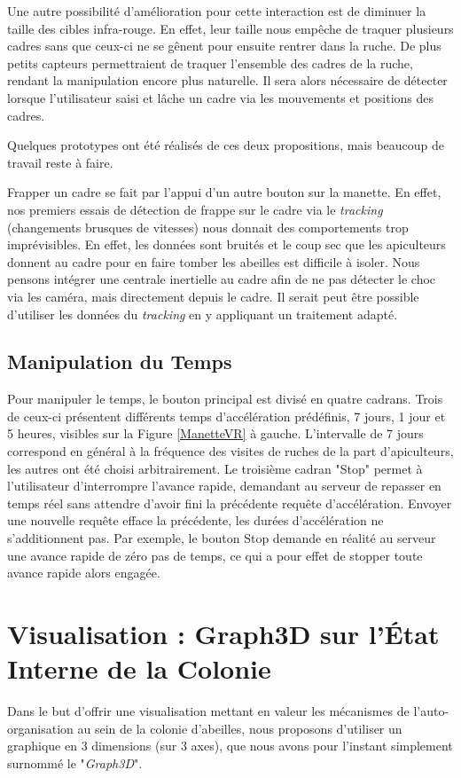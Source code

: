 		Une autre possibilité d'amélioration pour cette interaction est de diminuer la taille des cibles infra-rouge. En effet, leur taille nous empêche de traquer plusieurs cadres sans que ceux-ci ne se gênent pour ensuite rentrer dans la ruche. De plus petits capteurs permettraient de traquer l'ensemble des cadres de la ruche, rendant la manipulation encore plus naturelle. Il sera alors nécessaire de détecter lorsque l'utilisateur saisi et lâche un cadre via les mouvements et positions des cadres.
		
		Quelques prototypes ont été réalisés de ces deux propositions, mais beaucoup de travail reste à faire.
		
		Frapper un cadre se fait par l'appui d'un autre bouton sur la manette. En effet, nos premiers essais de détection de frappe sur le cadre via le \textit{tracking} (changements brusques de vitesses) nous donnait des comportements trop imprévisibles. En effet, les données sont bruités et le coup sec que les apiculteurs donnent au cadre pour en faire tomber les abeilles est difficile à isoler. Nous pensons intégrer une centrale inertielle au cadre afin de ne pas détecter le choc via les caméra, mais directement depuis le cadre. Il serait peut être possible d'utiliser les données du \textit{tracking} en y appliquant un traitement adapté.
		
		\subsection{Manipulation du Temps}
		
		Pour manipuler le temps, le bouton principal est divisé en quatre cadrans. Trois de ceux-ci présentent différents temps d'accélération prédéfinis, 7 jours, 1 jour et 5 heures, visibles sur la Figure \ref{ManetteVR} à gauche. L'intervalle de 7 jours correspond en général à la fréquence des visites de ruches de la part d'apiculteurs, les autres ont été choisi arbitrairement. Le troisième cadran "Stop" permet à l'utilisateur d'interrompre l'avance rapide, demandant au serveur de repasser en temps réel sans attendre d'avoir fini la précédente requête d'accélération. Envoyer une nouvelle requête efface la précédente, les durées d'accélération ne s'additionnent pas. Par exemple, le bouton Stop demande en réalité au serveur une avance rapide de zéro pas de temps, ce qui a pour effet de stopper toute avance rapide alors engagée.
		
	\section{Visualisation : Graph3D sur l'État Interne de la Colonie}
		Dans le but d'offrir une visualisation mettant en valeur les mécanismes de l'auto-organisation au sein de la colonie d'abeilles, nous proposons d'utiliser un graphique en 3 dimensions (sur 3 axes), que nous avons pour l'instant simplement surnommé le "\textit{Graph3D}".
		

